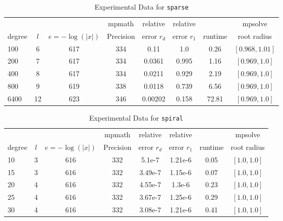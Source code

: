 \documentclass[sigconf]{acmart}
\begin{document}
\begin{table}[t]
\caption{Experimental Data for \texttt{sparse}}
\label{tab:sparse}
\vskip -0.15in
\begin{center}
\begin{small}
\begin{sc}
\begin{tabular}{lccccccc}
\toprule
&  &  & mpmath & relative  & relative &  & mpsolve \\
degree  & $l$& $e=-\log(|x|)$& Precision &error $r_d$       & error $r_1$ &runtime& root radius\\
\midrule
100 & 6 & 617 & 334 & 0.11 & 1.0 & 0.26 & $[0.968, 1.01]$\\
 200 & 7 & 617 & 334 & 0.0361 & 0.995 & 1.16 & $[0.969, 1.0]$\\
 400 & 8 & 617 & 334 & 0.0211 & 0.929 & 2.19 & $[0.969, 1.0]$\\
 800 & 9 & 619 & 338 & 0.0118 & 0.739 & 6.56 & $[0.969, 1.0]$\\
  6400 & 12 & 623 & 346 & 0.00202 & 0.158 & 72.81 & $[0.969, 1.0]$\\
\bottomrule
\end{tabular}
\end{sc}
\end{small}
\end{center}
\vskip 0.05in
\end{table}

\begin{table}[t]
\caption{Experimental Data for \texttt{spiral}} %
\label{tab:spiral}
\vskip -0.15in
\begin{center}
\begin{small}
\begin{sc}
\begin{tabular}{lccccccc}
\toprule
&  &  & mpmath & relative  & relative &  & mpsolve \\
degree  & $l$& $e=-\log(|x|)$& Precision &error $r_d$       & error $r_1$ &runtime& root radius\\
\midrule
 10 & 3 & 616 & 332 & 5.1e-7 & 1.21e-6 & 0.05 & $[1.0, 1.0]$\\
 15 & 3 & 616 & 332 & 3.49e-7 & 1.15e-6 & 0.07 & $[1.0, 1.0]$\\
 20 & 4 & 616 & 332 & 4.55e-7 & 1.3e-6 & 0.23 & $[1.0, 1.0]$\\
 25 & 4 & 616 & 332 & 3.67e-7 & 1.25e-6 & 0.29 & $[1.0, 1.0]$\\
 30 & 4 & 616 & 332 & 3.08e-7 & 1.21e-6 & 0.41 & $[1.0, 1.0]$\\
\bottomrule
\end{tabular}
\end{sc}
\end{small}
\end{center}
\vskip 0.05in
\end{table}
\end{document}
